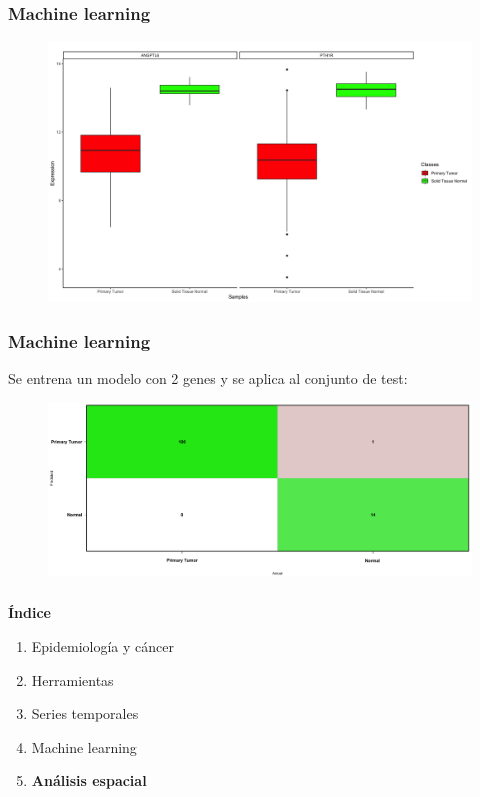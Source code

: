 \documentclass{beamer}
\begin{document}

\begin{frame}\frametitle{Machine learning}
	\begin{figure}
		\centering
		\includegraphics[width=.9\textwidth]{images/16_higado_biclase_43_knn_boxplots_mejor_metodo.png}
	\end{figure}
\end{frame}


\begin{frame}\frametitle{Machine learning}
	Se entrena un modelo con 2 genes y se aplica al conjunto de test:
	\begin{figure}
		\centering
		\includegraphics[width=.9\textwidth]{images/17_higado_biclase_18_svm_matriz_confusion_mejor_metodo.png}
	\end{figure}
\end{frame}

\begin{frame}\frametitle{}
	\Large{\textbf{Índice}}\\[2ex]
	\normalsize
	\begin{enumerate}
		\item Epidemiología y cáncer\\[2ex]
		\item Herramientas\\[2ex]
		\item Series temporales \\[2ex]
		\item Machine learning \\[2ex]
		\item \textbf{Análisis espacial} \\[2ex]
	\end{enumerate}
\end{frame}
\end{document}
